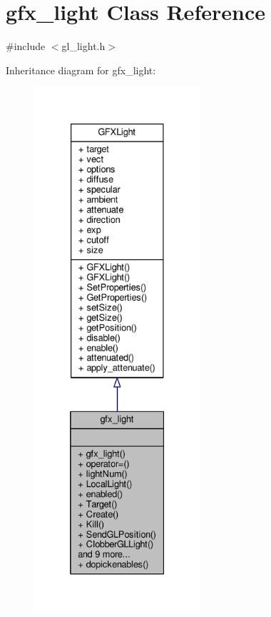 \hypertarget{classgfx__light}{}\section{gfx\+\_\+light Class Reference}
\label{classgfx__light}


{\ttfamily \#include $<$gl\+\_\+light.\+h$>$}



Inheritance diagram for gfx\+\_\+light\+:
\nopagebreak
\begin{figure}[H]
\begin{center}
\leavevmode
\includegraphics[height=550pt]{db/d87/classgfx__light__inherit__graph}
\end{center}
\end{figure}


